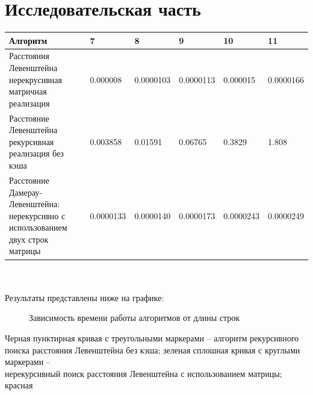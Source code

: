 \documentclass[12pt, a4paper]{article}
\begin{document}
\section{Исследовательская часть}
\begin{tabular}{|p{3cm}|p{2cm}|p{2cm}|p{2cm}|p{2cm}|p{2cm}|}
 \hline
 Алгоритм & 7 & 8 & 9 & 10 & 11\\
 \hline
 Расстояния Левенштейна нерекрусивная матричная 
 реализация & 0.000008 & 0.0000103 & 0.0000113 & 
 0.000015 & 0.0000166 \\
 \hline
 Расстояние Левенштейна рекурсивная реализация без 
 кэша & 0.003858 & 0.01591 & 0.06765 & 0.3829 & 
 1.808 \\
 \hline
 Расстояние  Дамерау-Левенштейна: нерекурсивно с 
 использованием двух строк матрицы & 0.0000133 & 
 0.0000140 & 0.0000173 & 0.0000243 & 0.0000249 \\
 \hline
\end{tabular}\\
\\
Результаты представлены ниже на графике:\\
\begin{figure}[h]
  \caption{Зависимость времени работы алгоритмов от длины строк}
  \label{img:algLevNRMatr, algDL3str, algLevRecNoCash}
\end{figure}
\newpage
Черная пунктирная кривая с треугольными маркерами -- 
алгоритм рекурсивного поиска расстояния Левенштейна 
без кэша; зеленая сплошная кривая с круглыми 
маркерами -- \\
нерекурсивный поиск расстояния 
Левенштейна с использованием матрицы; красная 
\end{document}
